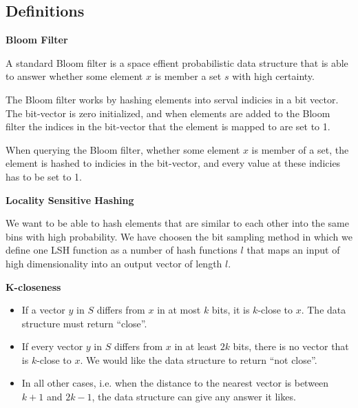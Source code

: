 \documentclass[a4paper,11pt]{article}
\begin{document}
\subsection{Definitions}
\begin{description}
\item \textbf{Bloom Filter}

A standard Bloom filter is a space effient probabilistic data structure that is able to answer whether some element $x$ is member a set $s$ with high certainty.

The Bloom filter works by hashing elements into serval indicies in a bit vector. The bit-vector is zero initialized, and when elements are added to the Bloom filter the indices in the bit-vector that the element is mapped to are set to 1.

When querying the Bloom filter, whether some element $x$ is member of a set, the element is hashed to indicies in the bit-vector, and every value at these indicies has to be set to 1.


\item \textbf{Locality Sensitive Hashing}

We want to be able to hash elements that are similar to each other into the same bins with high probability. We have choosen the bit sampling method  in which we define one LSH function as a number of hash functions $l$ that maps an input of high dimensionality into an output vector of length $l$.



\item \textbf{K-closeness}
  \begin{itemize}
    \item If a vector $y$ in $S$ differs from $x$ in at most $k$ bits, it is $k$-close to $x$. The data structure must return “close”.
    \item If every vector $y$ in $S$ differs from $x$ in at least $2k$ bits, there is no vector that is $k$-close to $x$. We would like the data structure to return “not close”.
    \item In all other cases, i.e. when the distance to the nearest vector is between $k+1$ and $2k-1$, the data structure can give any answer it likes.
  \end{itemize}

\end{description}
\end{document}
